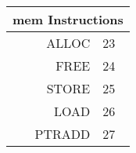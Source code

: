 \begin{tabular}{|r|l|}\hline
\multicolumn{2}{|c|}{mem Instructions}\\ \hline
ALLOC & 23 \\ \hline
FREE & 24 \\ \hline
STORE & 25 \\ \hline
LOAD & 26 \\ \hline
PTRADD & 27 \\ \hline
\end{tabular}
